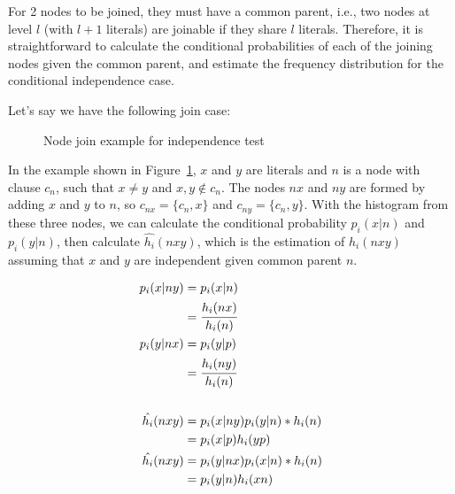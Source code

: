 For 2 nodes to be joined, they must have a common parent, i.e., two nodes at level $l$ (with $l+1$ literals) are
joinable if they share $l$ literals. Therefore, it is straightforward to calculate the conditional probabilities of each
of the joining nodes given the common parent, and estimate the frequency distribution for the conditional independence
case.

Let's say we have the following join case:
 
\begin{figure}[!h]
  \caption{Node join example for independence test}
  \centering
  \label{fig:joinIndepExample}
\end{figure}

In the example shown in Figure~\ref{fig:joinIndepExample}, $x$ and $y$ are literals and $n$ is a node with clause
$c_n$,
such that $x \neq y$ and $x,y \not \in c_n$. The nodes $nx$ and $ny$ are formed by adding $x$ and $y$ to $n$, so
$c_{nx}=\{c_n,x\}$ and $c_{ny}=\{c_n,y\}$. With the histogram from these three nodes, we can calculate the conditional
probability $p_i(x|n)$ and $p_i(y|n)$, then calculate $\hat{h_i}(nxy)$, which is the estimation of
$h_i(nxy)$ assuming that $x$ and $y$ are independent given common parent $n$.

\begin{align}
 p_i(x|ny) &= p_i(x|n) \\ 
 &= \cfrac{h_i(nx)}{h_i(n)} \\ 
 p_i(y|nx) &= p_i(y|p) \\ 
 &= \cfrac{h_i(ny)}{h_i(n)} \\ \\ 
 \hat{h_i}(nxy) &= p_i(x|ny)p_i(y|n)*h_i(n) \\ 
 &= p_i(x|p)h_i(yp) \\ 
 \hat{h_i}(nxy) &= p_i(y|nx)p_i(x|n)*h_i(n) \\ 
 &= p_i(y|n)h_i(xn)
\label{eq:condindep}
\end{align}

